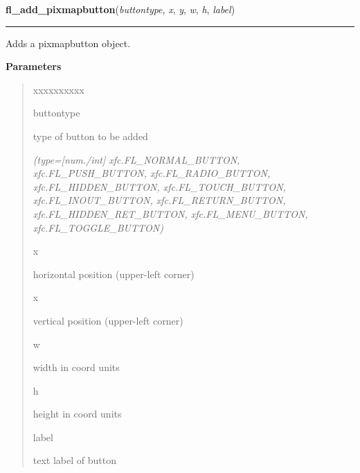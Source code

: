     \label{xformslib:library:fl_add_pixmapbutton}

    \vspace{0.5ex}

\hspace{.8\funcindent}\begin{boxedminipage}{\funcwidth}

    \raggedright \textbf{fl\_add\_pixmapbutton}(\textit{buttontype}, \textit{x}, \textit{y}, \textit{w}, \textit{h}, \textit{label})

    \vspace{-1.5ex}

    \rule{\textwidth}{0.5\fboxrule}
\setlength{\parskip}{2ex}
    Adds a pixmapbutton object.

\setlength{\parskip}{1ex}
      \textbf{Parameters}
      \vspace{-1ex}

      \begin{quote}
        \begin{Ventry}{xxxxxxxxxx}

          \item[buttontype]

          type of button to be added

            {\it (type=[num./int] xfc.FL\_NORMAL\_BUTTON, xfc.FL\_PUSH\_BUTTON, 
xfc.FL\_RADIO\_BUTTON, xfc.FL\_HIDDEN\_BUTTON, xfc.FL\_TOUCH\_BUTTON, 
xfc.FL\_INOUT\_BUTTON, xfc.FL\_RETURN\_BUTTON, xfc.FL\_HIDDEN\_RET\_BUTTON,
xfc.FL\_MENU\_BUTTON, xfc.FL\_TOGGLE\_BUTTON)}

          \item[x]

          horizontal position (upper-left corner)

          \item[x]

          vertical position (upper-left corner)

          \item[w]

          width in coord units

          \item[h]

          height in coord units

          \item[label]

          text label of button


\end{Ventry}
\end{quote}
\end{boxedminipage}
